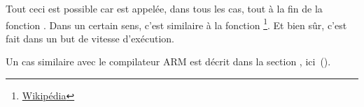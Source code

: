 \newcommand{\URLSJ}{\href{http://go.yurichev.com/17121}{Wikipédia}}

Tout ceci est possible car \printf est appelée, dans tous les cas, tout à la fin
de la fonction \ttf.
Dans un certain sens, c'est similaire à la fonction \footnote{\URLSJ}.
Et bien sûr, c'est fait dans un but de vitesse d'exécution.

Un cas similaire avec le compilateur ARM est décrit dans la section \q{\PrintfSeveralArgumentsSectionName},
ici~().



